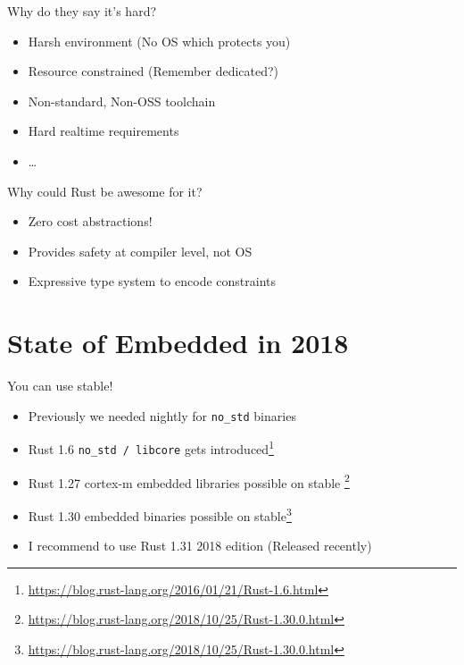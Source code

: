\documentclass[aspectratio=1610,14pt,t]{beamer}
\begin{document}
\begin{frame}[c]{Why do they say it's hard?}
  \begin{itemize}
    \item Harsh environment (No OS which protects you)
    \item Resource constrained (Remember dedicated?)
    \item Non-standard, Non-OSS toolchain
    \item Hard realtime requirements
    \item \ldots
  \end{itemize}
\end{frame}

\begin{frame}[c]{Why could Rust be awesome for it?}
  \begin{itemize}
    \item Zero cost abstractions!
    \item Provides safety at compiler level, not OS
    \item Expressive type system to encode constraints
  \end{itemize}
\end{frame}

\section{State of Embedded in 2018}
\begin{frame}[c]{You can use stable!}
  \begin{itemize}
    \item Previously we needed nightly for \texttt{no\_std} binaries
    \item Rust 1.6 \texttt{no\_std / libcore} gets
      introduced\footnote{\url{https://blog.rust-lang.org/2016/01/21/Rust-1.6.html}}
    \item Rust 1.27 cortex-m embedded libraries possible on stable
      \footnote{\url{https://blog.rust-lang.org/2018/10/25/Rust-1.30.0.html}}
    \item Rust 1.30 embedded binaries possible on
      stable\footnote{\url{https://blog.rust-lang.org/2018/10/25/Rust-1.30.0.html}}
    \item I recommend to use Rust 1.31 2018 edition (Released recently)
  \end{itemize}
\end{frame}
\end{document}
